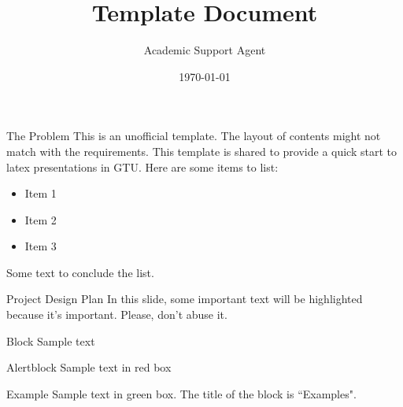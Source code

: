\documentclass{article}
\title{Template Document}
\author{Academic Support Agent}
\date{\today}
\begin{document}
\maketitle

\begin{frame}
    \titlepage
\end{frame}


%     



\begin{frame}{The Problem}
	This is an unofficial template. The layout of contents might not match with the requirements. This template is shared to provide a quick start to latex presentations in GTU. Here are some items to list:\\
	\vspace{0.03\textheight} %
	\begin{itemize}
		\item Item 1
		\item Item 2
		\item Item 3
	\end{itemize}
	\vspace{0.03\textheight} %
	Some text to conclude the list.
\end{frame}


\begin{frame}{Project Design Plan}
	In this slide, some important text will be \alert{highlighted} because it's important. Please, don't abuse it.
	
	\begin{block}{Block}
		Sample text
	\end{block}
	
	\begin{alertblock}{Alertblock}
		Sample text in red box
	\end{alertblock}
	
	\begin{examples}{Example}
		Sample text in green box. The title of the block is ``Examples".
	\end{examples}
\end{frame}
\end{document}

